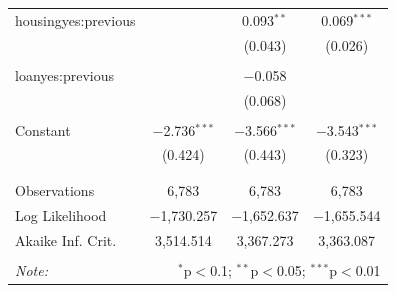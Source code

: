 \documentclass[11pt]{article}
\begin{document}
{\begin{table}[H]
{\begin{tabular}{@{\extracolsep{5pt}}lccc}
 housingyes:previous &  & 0.093$^{**}$ & 0.069$^{***}$ \\ 
  &  & (0.043) & (0.026) \\ 
  & & & \\ 
 loanyes:previous &  & $-$0.058 &  \\ 
  &  & (0.068) &  \\ 
  & & & \\ 
 Constant & $-$2.736$^{***}$ & $-$3.566$^{***}$ & $-$3.543$^{***}$ \\ 
  & (0.424) & (0.443) & (0.323) \\ 
  & & & \\ 
\hline \\[-1.8ex] 
Observations & 6,783 & 6,783 & 6,783 \\ 
Log Likelihood & $-$1,730.257 & $-$1,652.637 & $-$1,655.544 \\ 
Akaike Inf. Crit. & 3,514.514 & 3,367.273 & 3,363.087 \\ 
\hline 
\hline \\[-1.8ex] 
\textit{Note:}  & \multicolumn{3}{r}{$^{*}$p$<$0.1; $^{**}$p$<$0.05; $^{***}$p$<$0.01} \\ 
\end{tabular} 
}
\end{table} 









}
\end{document}
